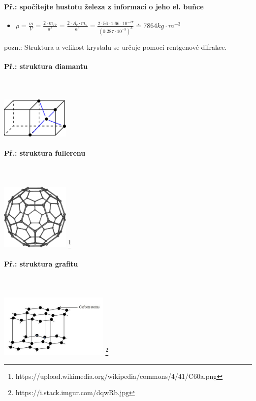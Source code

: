 \paragraph{Př.: spočítejte hustotu železa z informací o jeho el. buňce}
\begin{itemize}
\item $\rho = \frac{m}{V} = \frac{2 \cdot m_{Fe} }{a^3} = \frac{2 \cdot A_r \cdot m_u }{a^3} = \frac{2 \cdot 56 \cdot 1.66 \cdot 10^{-27}}{(0.287 \cdot 10^{-9})^3} \doteq 7864kg \cdot m^{-3} $
\end{itemize}
pozn.: Struktura a velikost krystalu se určuje pomocí rentgenové difrakce. 

\paragraph{Př.: struktura diamantu}\mbox{}\\ \mbox{} \\
\includegraphics[width=0.25\textwidth]{pictures/002.png}

\paragraph{Př.: struktura fullerenu}\mbox{}\\ \mbox{} \\
\includegraphics[width=0.25\textwidth]{pictures/003.png}
\footnote{https://upload.wikimedia.org/wikipedia/commons/4/41/C60a.png}

\paragraph{Př.: struktura grafitu}\mbox{}\\ \mbox{} \\
\includegraphics[width=0.4\textwidth]{pictures/004.jpg}
\footnote{https://i.stack.imgur.com/dqwRb.jpg}

